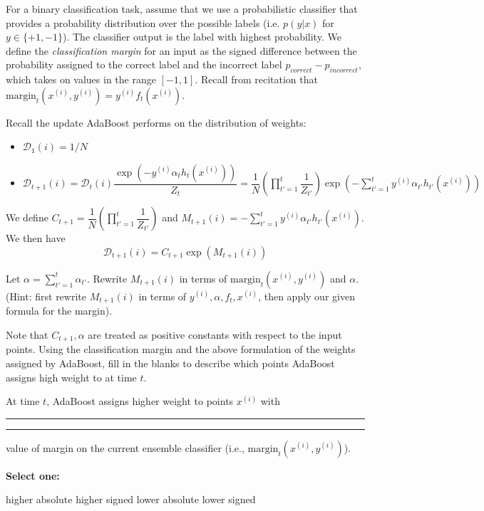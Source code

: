 \documentclass[11pt,addpoints,answers]{exam}
\newcommand{\sone}{\textbf{Select one: }}
\newcommand{\D}{\mathcal{D}}
\newcommand{\margin}{\text{margin}}
\begin{document}
\begin{questions}
\begin{parts}
For a binary classification task, assume that we use a probabilistic classifier that provides a probability distribution over the possible labels (i.e. $p(y|x)$ for $y \in \{+1,-1\}$). The classifier output is the label with highest probability.
We define the \textit{classification margin} for an input as the signed difference between the probability assigned to the correct label and the incorrect label $p_{correct} - p_{incorrect}$, which takes on values in the range $[-1, 1]$.
Recall from recitation that $\margin_t (x^{(i)}, y^{(i)}) = y^{(i)} f_t (x^{(i)})$.

\begin{subparts}
\subpart[1]  Recall the update AdaBoost performs on the distribution of weights:
\begin{itemize}
    \item $\D_1 (i) = 1 / N$
    \item $\D_{t+1} (i) = \D_t (i) \dfrac{\exp(-y^{(i)} \alpha_t h_t (x^{(i)}))}{Z_t} = \dfrac{1}{N} \left( \prod_{t'=1}^t \dfrac{1}{Z_{t'}} \right) \exp ( - \sum_{t'=1}^t y^{(i)} \alpha_{t'} h_{t'} (x^{(i)}) )$
\end{itemize}
We define $C_{t+1} = \dfrac{1}{N} \left( \prod_{t'=1}^t \dfrac{1}{Z_{t'}} \right)$ and $M_{t+1} (i) =  -\sum_{t'=1}^t y^{(i)} \alpha_{t'} h_{t'} (x^{(i)})$. 
We then have $$\D_{t+1} (i) = C_{t+1} \exp (M_{t+1} (i))$$

Let $\alpha = \sum_{t'=1}^t \alpha_{t'}$. Rewrite $M_{t+1} (i)$ in terms of $\margin_t (x^{(i)}, y^{(i)})$ and $\alpha$. (Hint: first rewrite $M_{t+1} (i)$ in terms of $y^{(i)}, \alpha, f_t, x^{(i)}$, then apply our given formula for the margin).

\begin{your_solution}[height=2.5cm, width=6cm]
\end{your_solution}

\clearpage

\subpart[1]  Note that $C_{t+1}, \alpha$ are treated as positive constants with respect to the input points. Using the classification margin and the above formulation of the weights assigned by AdaBoost, fill in the blanks to describe which points AdaBoost assigns high weight to at time $t$.

At time $t$, AdaBoost assigns higher weight to points $x^{(i)}$ with \rule{1cm}{0.15mm} \rule{1cm}{0.15mm} value of margin on the current ensemble classifier (i.e., $\margin_t (x^{(i)}, y^{(i)})$).

    \sone
    \begin{checkboxes}
    \choice higher absolute
    \choice higher signed
    \choice lower absolute
    \choice lower signed
    \end{checkboxes}


\end{subparts}
\end{parts}
\end{questions}
\end{document}
